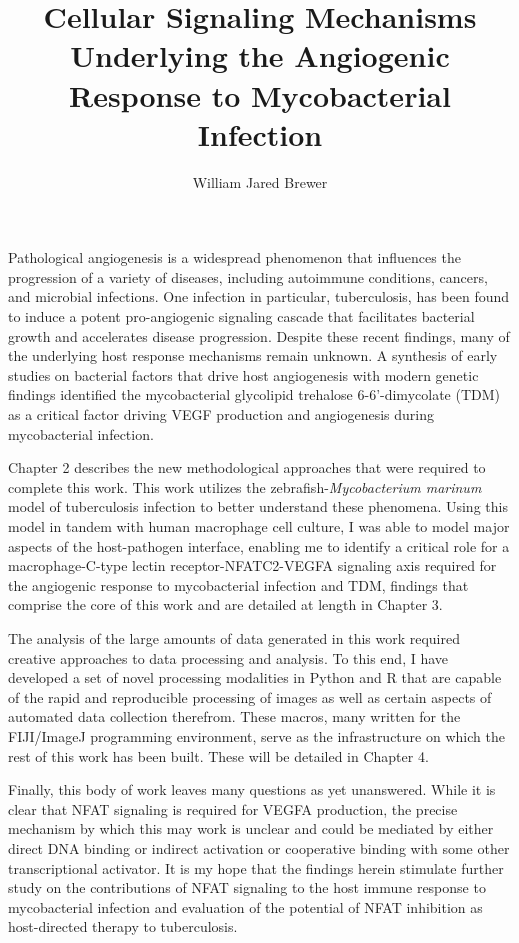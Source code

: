 \documentclass[PhD]{dukethesis2006}
\author{William Jared Brewer}
\title{Cellular Signaling Mechanisms Underlying the Angiogenic Response to Mycobacterial Infection}
\begin{document}
\maketitle{}

\makeabstract{}

\Copyright


\abstract

Pathological angiogenesis is a widespread phenomenon that influences the progression of a variety of diseases, including autoimmune conditions, cancers, and microbial infections. One infection in particular, tuberculosis, has been found to induce a potent pro-angiogenic signaling cascade that facilitates bacterial growth and accelerates disease progression. Despite these recent findings, many of the underlying host response mechanisms remain unknown. A synthesis of early studies on bacterial factors that drive host angiogenesis with modern genetic findings identified the mycobacterial glycolipid trehalose 6-6'-dimycolate (TDM) as a critical factor driving VEGF production and angiogenesis during mycobacterial infection. 

Chapter 2 describes the new methodological approaches that were required to complete this work. This work utilizes the zebrafish-\textit{Mycobacterium marinum} model of tuberculosis infection to better understand these phenomena. Using this model in tandem with human macrophage cell culture, I was able to model major aspects of the host-pathogen interface, enabling me to identify a critical role for a macrophage-C-type lectin receptor-NFATC2-VEGFA signaling axis required for the angiogenic response to mycobacterial infection and TDM, findings that comprise the core of this work and are detailed at length in Chapter 3. 

The analysis of the large amounts of data generated in this work required creative approaches to data processing and analysis. To this end, I have developed a set of novel processing modalities in Python and R that are capable of the rapid and reproducible processing of images as well as certain aspects of automated data collection therefrom. These macros, many written for the FIJI/ImageJ programming environment, serve as the infrastructure on which the rest of this work has been built. These will be detailed in Chapter 4.

Finally, this body of work leaves many questions as yet unanswered. While it is clear that NFAT signaling is required for VEGFA production, the precise mechanism by which this may work is unclear and could be mediated by either direct DNA binding or indirect activation or cooperative binding with some other transcriptional activator. It is my hope that the findings herein stimulate further study on the contributions of NFAT signaling to the host immune response to mycobacterial infection and evaluation of the potential of NFAT inhibition as host-directed therapy to tuberculosis.
\end{document}
